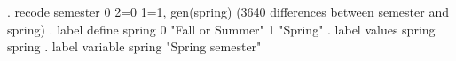 . recode semester 0 2=0 1=1, gen(spring)
(3640 differences between semester and spring)
{\smallskip}
. label define spring 0 "Fall or Summer" 1 "Spring"
{\smallskip}
. label values spring spring
{\smallskip}
. label variable spring "Spring semester"
{\smallskip}
